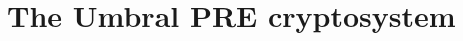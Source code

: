 \documentclass{amsart}
\begin{document}
%
%
%
%
%
%
%
%
%
%
%

\section{The Umbral PRE cryptosystem}
\end{document}
